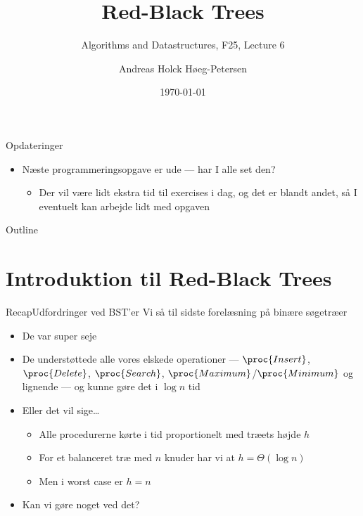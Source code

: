 \documentclass[aspectratio=1610]{beamer}
\title[ALG25 - Lecture 6]
{Red-Black Trees}
\subtitle
{Algorithms and Datastructures, F25, Lecture 6}
\author[Andreas H. Høeg-Petersen]
{Andreas Holck Høeg-Petersen}
\institute[AAU]{%
  Department of Computer Science\\
  Aalborg University
}
\date {\today}
\begin{document}
\begin{frame}
  \titlepage
\end{frame}

\begin{frame}{Opdateringer}{}
    \begin{itemize}[<+->]
        \small
        \item Næste programmeringsopgave er ude --- har I alle set den?
            \begin{itemize}
                \item Der vil være lidt ekstra tid til exercises i dag, og det
                    er blandt andet, så I eventuelt kan arbejde lidt med opgaven
            \end{itemize}
    \end{itemize}
\end{frame}


\begin{frame}{Outline}
  \tableofcontents
\end{frame}


\section{Introduktion til Red-Black Trees}

\begin{frame}{Recap}{Udfordringer ved BST'er}
    Vi så til sidste forelæsning på binære søgetræer

    \begin{itemize}[<+(1)->]
        \item De var super seje
        \item De understøttede alle vores elskede operationer ---
            $\proc{Insert}$, $\proc{Delete}$, $\proc{Search}$,
            $\proc{Maximum}$/$\proc{Minimum}$ og lignende --- og kunne gøre det
            i $\log n$ tid
        \item Eller det vil sige\ldots
            \begin{itemize}
                \item Alle procedurerne kørte i tid proportionelt med træets
                    højde $h$
                \item For et \alert{balanceret} træ med $n$ knuder har vi at $h
                    = \Theta(\log n)$
                \item Men i worst case er $h = n$
            \end{itemize}
        \item Kan vi gøre noget ved det?
    \end{itemize}
\end{frame}
\end{document}
